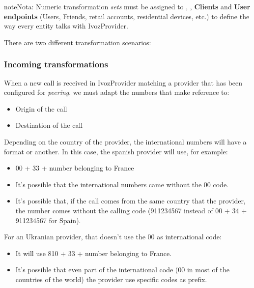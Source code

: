 \documentclass[letterpaper,10pt,spanish]{sphinxmanual}
\begin{document}
\begin{notice}{note}{Nota:}
Numeric transformation \emph{sets} must be assigned to {\hyperref[administration_portal/brand/providers/carriers:carriers]{}}, {\hyperref[administration_portal/brand/providers/ddi_providers:ddi\string-providers]{}}, \textbf{Clients} and \textbf{User
endpoints} (Users, Friends, retail accounts, residential devices, etc.) to define the way every entity talks
with IvozProvider.
\end{notice}

There are two different transformation scenarios:


\subsubsection{Incoming transformations}
\label{administration_portal/brand/settings/numeric_transformations:incoming-transformations}
When a new call is received in IvozProvider matching a provider that has been
configured for \emph{peering}, we must adapt the numbers that make reference to:
\begin{itemize}
\item {} 
Origin of the call

\item {} 
Destination of the call

\end{itemize}

Depending on the country of the provider, the international numbers will have
a format or another. In this case, the spanish provider will use, for example:
\begin{itemize}
\item {} 
00 + 33 + number belonging to France

\item {} 
It's possible that the international numbers came without the 00 code.

\item {} 
It's possible that, if the call comes from the same country that the provider,
the number comes without the calling code (911234567 instead of 00 + 34 +
911234567 for Spain).

\end{itemize}

For an Ukranian provider, that doesn't use the 00 as international code:
\begin{itemize}
\item {} 
It will use 810 + 33 + number belonging to France.

\item {} 
It's possible that even part of the international code (00 in most of the
countries of the world) the provider use specific codes as prefix.

\end{itemize}
\end{document}

